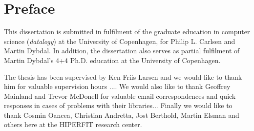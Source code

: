 \chapter{Preface}
This dissertation is submitted in fulfilment of the graduate education
in computer science (\textit{datalogy}) at the University of
Copenhagen, for Philip L. Carlsen and Martin Dybdal. In addition, the
dissertation also serves as partial fulfilment of Martin Dybdal's 4+4
Ph.D. education at the University of Copenhagen.

The thesis has been supervised by Ken Friis Larsen and we would like
to thank him for valuable supervision hours .... We would also like to
thank Geoffrey Mainland and Trevor McDonell for valuable email
correspondences and quick responses in cases of problems with their
libraries... Finally we would like to thank Cosmin Oancea, Christian
Andretta, Jost Berthold, Martin Elsman and others here at the HIPERFIT
research center.
